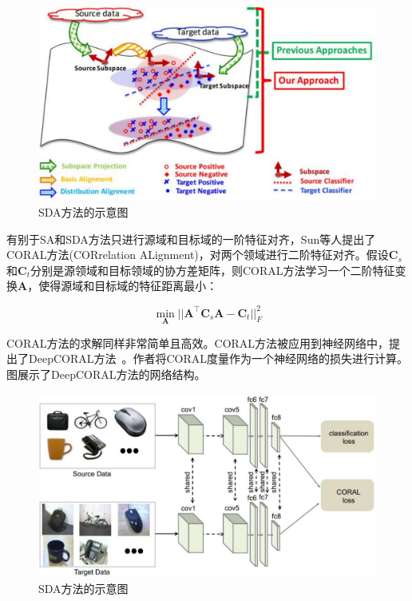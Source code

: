 \begin{figure}[htbp]
	\centering
	\includegraphics[scale=0.6]{./figures/fig-subspace-sda.pdf}
	\caption{SDA方法的示意图}
	\label{fig-subspace-sda}
\end{figure}

有别于SA和SDA方法只进行源域和目标域的一阶特征对齐，Sun等人提出了CORAL方法(CORrelation ALignment)，对两个领域进行二阶特征对齐。假设$\mathbf{C}_s$和$\mathbf{C}_t$分别是源领域和目标领域的协方差矩阵，则CORAL方法学习一个二阶特征变换$\mathbf{A}$，使得源域和目标域的特征距离最小：

\begin{equation}
	\min_\mathbf{A} ||\mathbf{A}^\top \mathbf{C}_s \mathbf{A} - \mathbf{C}_t||^2_F
\end{equation}

CORAL方法的求解同样非常简单且高效。CORAL方法被应用到神经网络中，提出了DeepCORAL方法~\cite{sun2016deep}。作者将CORAL度量作为一个神经网络的损失进行计算。图展示了DeepCORAL方法的网络结构。

\begin{figure}[htbp]
	\centering
	\includegraphics[scale=0.4]{./figures/fig-subspace-deepcoral.pdf}
	\caption{SDA方法的示意图}
	\label{fig-subspace-deepcoral}
\end{figure}


